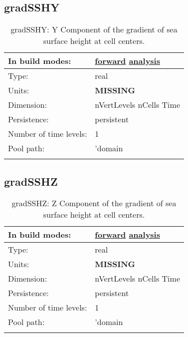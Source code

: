 \subsection[gradSSHY]{gradSSHY}
\label{subsec:var_sec_diagnostics_gradSSHY}
\begin{center}
\begin{longtable}{| p{2.0in} | p{4.0in} |}
        \hline 
        In build modes: & \hyperref[subsec:forward_var_tab_diagnostics]{forward} \hyperref[subsec:analysis_var_tab_diagnostics]{analysis} \\
        \hline 
        Type: & real \\
        \hline 
        Units: & {\bf \color{red} MISSING} \\
        \hline 
        Dimension: & nVertLevels nCells Time \\
        \hline 
        Persistence: & persistent \\
        \hline 
        Number of time levels: & 1 \\
        \hline 
            Pool path: & 'domain %
 \\
		 \hline 
    \caption{gradSSHY: Y Component of the gradient of sea surface height at cell centers.}
\end{longtable}
\end{center}
\subsection[gradSSHZ]{gradSSHZ}
\label{subsec:var_sec_diagnostics_gradSSHZ}
\begin{center}
\begin{longtable}{| p{2.0in} | p{4.0in} |}
        \hline 
        In build modes: & \hyperref[subsec:forward_var_tab_diagnostics]{forward} \hyperref[subsec:analysis_var_tab_diagnostics]{analysis} \\
        \hline 
        Type: & real \\
        \hline 
        Units: & {\bf \color{red} MISSING} \\
        \hline 
        Dimension: & nVertLevels nCells Time \\
        \hline 
        Persistence: & persistent \\
        \hline 
        Number of time levels: & 1 \\
        \hline 
            Pool path: & 'domain %
 \\
		 \hline 
    \caption{gradSSHZ: Z Component of the gradient of sea surface height at cell centers.}
\end{longtable}
\end{center}
